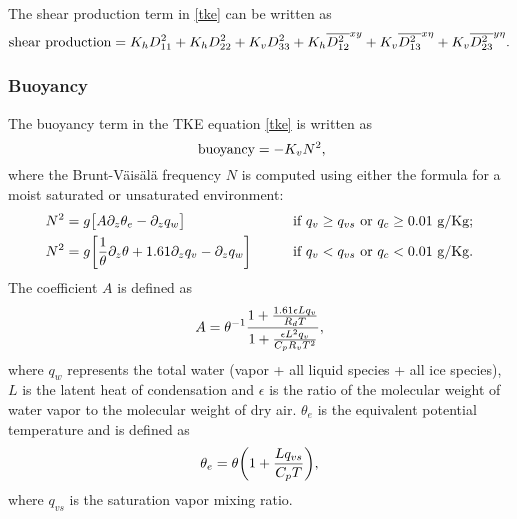 The shear production term in \eqref{tke} can be written as
%
\begin{equation}
\hbox{shear production} =  K_h D_{11}^2
+ K_h D_{22}^2
+ K_v D_{33}^2
+ K_h {\overline{D_{12}^2}}^{xy}
+ K_v {\overline{D_{13}^2}}^{x\eta}
+ K_v {\overline{D_{23}^2}}^{y\eta}.
\notag
\end{equation}

\subsubsection{Buoyancy}

The buoyancy term in the TKE equation \eqref{tke} is written as
%
\begin{equation}
\hbox{ buoyancy} = - K_v N^2,
\notag
\end{equation}
%
\noindent
where the Brunt-V\"ais\"al\"a frequency $N$ is computed using either 
the formula for a moist saturated or unsaturated environment:
%
\begin{alignat}{2}
N^2 & = g \bigl[A {\partial_z \theta_e } 
- {\partial_z q_w } \bigr] & \qquad
& \hbox{if $q_v \ge q_{vs}$ or $q_c \ge 0.01$ g/Kg;} \notag \\
N^2 & = g \biggl[{1 \over \theta}{\partial_z \theta}
+ 1.61 {\partial_z q_v } - {\partial_z q_w }
\biggr]
& \qquad 
& \hbox{if $q_v < q_{vs}$ or $q_c < 0.01$ g/Kg}.
\notag
\end{alignat}
%
\noindent
The coefficient $A$ is defined as
%
\begin{equation}
A = \theta^{-1} 
{ 1 + {1.61\epsilon L q_v \over R_d T} \over
1 + {\epsilon L^2 q_v \over C_pR_v T^2} },
\notag
\end{equation}
%
\noindent
where $q_w$ represents the total water (vapor + all liquid species 
+ all ice species), $L$ is the latent heat of condensation and
$\epsilon$ is the ratio of the molecular weight of water vapor to the molecular weight of
dry air.  $\theta_e$ is the equivalent potential temperature and is
defined as 
%
\begin{equation}
\theta_e = \theta \biggl(1 + { L q_{vs} \over C_p T} \biggr),
\notag
\end{equation}
%
\noindent
where $q_{vs}$ is the saturation vapor mixing ratio.

